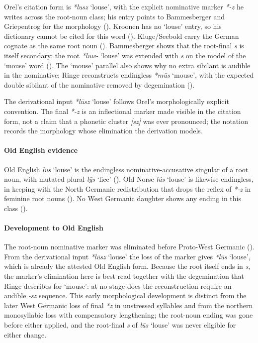\documentclass[
  british,
  a4paper,
]{article}
\providecommand{\Recon}[1]{\emph{*#1}}
\begin{document}
Orel's citation form is \emph{*lusz} `louse', with the explicit
nominative marker \emph{*-z} he writes across the root-noun class; his
entry points to Bammesberger and Griepentrog for the morphology
(). Kroonen has no `louse' entry,
so his dictionary cannot be cited for this word
(). Kluge/Seebold carry the
German cognate as the same root noun
(). Bammesberger shows
that the root-final \emph{s} is itself secondary: the root
{\emph{*luw-}} `louse' was extended with \emph{s} on the model of the
`mouse' word ().
The `mouse' parallel also shows why no extra sibilant is audible in the
nominative: Ringe reconstructs endingless {\emph{*mūs}} `mouse', with
the expected double sibilant of the nominative removed by degemination
().

The derivational input \Recon{lūsz} `louse' follows Orel's
morphologically explicit convention. The final \emph{*-z} is an
inflectional marker made visible in the citation form, not a claim that
a phonetic cluster \emph{{[}sz{]}} was ever pronounced; the notation
records the morphology whose elimination the derivation models.

\paragraph{Old English evidence}\label{old-english-evidence-41}

Old English {\emph{lūs}} `louse' is the endingless nominative-accusative
singular of a root noun, with mutated plural \emph{lȳs} `lice'
(). Old Norse \emph{lús}
`louse' is likewise endingless, in keeping with the North Germanic
redistribution that drops the reflex of \emph{*-z} in feminine root
nouns (). No West Germanic
daughter shows any ending in this class
().

\paragraph{Development to Old
English}\label{development-to-old-english-41}

The root-noun nominative marker was eliminated before Proto-West
Germanic ().
From the derivational input \Recon{lūsz} `louse' the loss of the marker
gives \Recon{lūs} `louse', which is already the attested Old English
form. Because the root itself ends in \emph{s}, the marker's elimination
here is best read together with the degemination that Ringe describes
for `mouse': at no stage does the reconstruction require an audible
\emph{-sz} sequence. This early morphological development is distinct
from the later West Germanic loss of final \emph{*z} in unstressed
syllables and from the northern monosyllabic loss with compensatory
lengthening; the root-noun ending was gone before either applied, and
the root-final \emph{s} of \emph{lūs} `louse' was never eligible for
either change.
\end{document}
